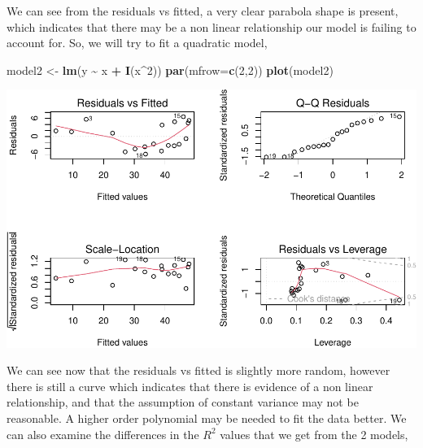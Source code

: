 \documentclass[
  11pt,
]{article}
\newenvironment{Shaded}{\begin{snugshade}}{\end{snugshade}}
\newcommand{\AttributeTok}[1]{\textcolor[rgb]{0.13,0.29,0.53}{#1}}
\newcommand{\DecValTok}[1]{\textcolor[rgb]{0.00,0.00,0.81}{#1}}
\newcommand{\FunctionTok}[1]{\textcolor[rgb]{0.13,0.29,0.53}{\textbf{#1}}}
\newcommand{\NormalTok}[1]{#1}
\newcommand{\OtherTok}[1]{\textcolor[rgb]{0.56,0.35,0.01}{#1}}
\newcommand{\SpecialCharTok}[1]{\textcolor[rgb]{0.81,0.36,0.00}{\textbf{#1}}}
\begin{document}
We can see from the residuals vs fitted, a very clear parabola shape is
present, which indicates that there may be a non linear relationship our
model is failing to account for. So, we will try to fit a quadratic
model,

\begin{Shaded}
\begin{Highlighting}[]
\NormalTok{model2 }\OtherTok{\textless{}{-}} \FunctionTok{lm}\NormalTok{(y }\SpecialCharTok{\textasciitilde{}}\NormalTok{ x }\SpecialCharTok{+} \FunctionTok{I}\NormalTok{(x}\SpecialCharTok{\^{}}\DecValTok{2}\NormalTok{))}
\FunctionTok{par}\NormalTok{(}\AttributeTok{mfrow=}\FunctionTok{c}\NormalTok{(}\DecValTok{2}\NormalTok{,}\DecValTok{2}\NormalTok{))}
\FunctionTok{plot}\NormalTok{(model2)}
\end{Highlighting}
\end{Shaded}

\includegraphics{examples_files/figure-latex/unnamed-chunk-47-1.pdf}

We can see now that the residuals vs fitted is slightly more random,
however there is still a curve which indicates that there is evidence of
a non linear relationship, and that the assumption of constant variance
may not be reasonable. A higher order polynomial may be needed to fit
the data better. We can also examine the differences in the \(R^2\)
values that we get from the 2 models,

\begin{Shaded}
\end{Shaded}
\end{document}
